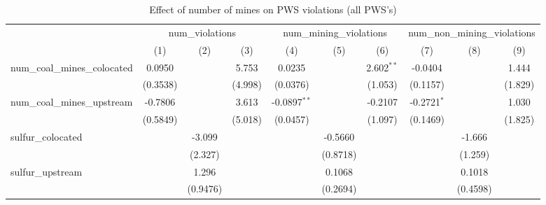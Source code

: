 
\begin{table}[htbp]
   \caption{\label{olsrf2sls_nummine_count_vio_1985to2005allhucs} Effect of number of mines on PWS violations (all PWS's)}
   \bigskip
   \centering
   \begin{adjustbox}{width = \textwidth, center}
      \begin{tabular}{lccccccccc}
         \toprule
          & \multicolumn{3}{c}{num\_violations} & \multicolumn{3}{c}{num\_mining\_violations} & \multicolumn{3}{c}{num\_non\_mining\_violations}\\
                                                            & (1)           & (2)           & (3)           & (4)            & (5)           & (6)           & (7)           & (8)           & (9)\\  
         \midrule 
         num\_coal\_mines\_colocated                        & 0.0950        &               & 5.753         & 0.0235         &               & 2.602$^{**}$  & -0.0404       &               & 1.444\\   
                                                            & (0.3538)      &               & (4.998)       & (0.0376)       &               & (1.053)       & (0.1157)      &               & (1.829)\\   
         num\_coal\_mines\_upstream                         & -0.7806       &               & 3.613         & -0.0897$^{**}$ &               & -0.2107       & -0.2721$^{*}$ &               & 1.030\\   
                                                            & (0.5849)      &               & (5.018)       & (0.0457)       &               & (1.097)       & (0.1469)      &               & (1.825)\\   
         sulfur\_colocated                                  &               & -3.099        &               &                & -0.5660       &               &               & -1.666        &   \\   
                                                            &               & (2.327)       &               &                & (0.8718)      &               &               & (1.259)       &   \\   
         sulfur\_upstream                                   &               & 1.296         &               &                & 0.1068        &               &               & 0.1018        &   \\   
                                                            &               & (0.9476)      &               &                & (0.2694)      &               &               & (0.4598)      &   \\   

\end{tabular}
\end{adjustbox}
\end{table}
